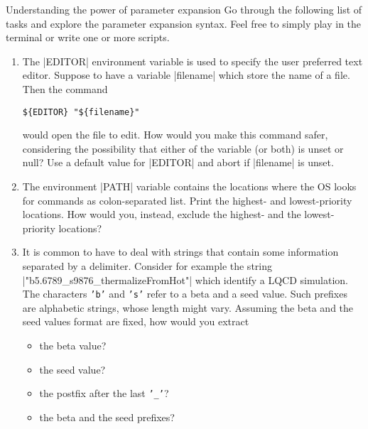 
\begin{exercise}[Inspirational]{Understanding the power of parameter expansion}
    Go through the following list of tasks and explore the parameter expansion syntax.
    Feel free to simply play in the terminal or write one or more scripts.
    \begin{enumerate}
        \item The \bash|EDITOR| environment variable is used to specify the user preferred text editor.
              Suppose to have a variable \bash|filename| which store the name of a file.
              Then the command
              \begin{lstlisting}[style=MyBash]
                  ${EDITOR} "${filename}"
              \end{lstlisting}
              would open the file to edit.
              How would you make this command safer, considering the possibility that either of the variable (or both) is unset or null?
              Use a default value for \bash|EDITOR| and abort if \bash|filename| is unset.
        \item The environment \bash|PATH| variable contains the locations where the OS looks for commands as colon-separated list.
              Print the highest- and lowest-priority locations.
              How would you, instead, exclude the highest- and the lowest-priority locations?
        \item It is common to have to deal with strings that contain some information separated by a delimiter.
              Consider for example the string \bash|"b5.6789_s9876_thermalizeFromHot"| which identify a LQCD simulation.
              The characters \texttt{'b'} and \texttt{'s'} refer to a beta and a seed value.
              Such prefixes are alphabetic strings, whose length might vary.
              Assuming the beta and the seed values format are fixed, how would you extract
              \begin{itemize}
                  \item the beta value?
                  \item the seed value?
                  \item the postfix after the last \texttt{'\_'}?
                  \item the beta and the seed prefixes?
              \end{itemize}

\end{enumerate}
\end{exercise}

